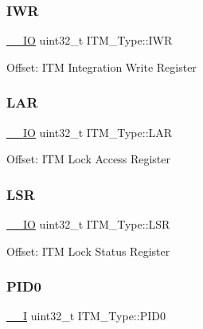 \subsubsection{\texorpdfstring{IWR}{IWR}}
{\footnotesize\ttfamily \mbox{\hyperlink{group___c_m_s_i_s___c_m3__core__definitions_gaec43007d9998a0a0e01faede4133d6be}{\+\_\+\+\_\+\+IO}} uint32\+\_\+t I\+T\+M\+\_\+\+Type\+::\+I\+WR}

Offset\+: I\+TM Integration Write Register ~\newline
 \mbox{\label{struct_i_t_m___type_a33025af19748bd3ca5cf9d6b14150001}} 
\subsubsection{\texorpdfstring{LAR}{LAR}}
{\footnotesize\ttfamily \mbox{\hyperlink{group___c_m_s_i_s___c_m3__core__definitions_gaec43007d9998a0a0e01faede4133d6be}{\+\_\+\+\_\+\+IO}} uint32\+\_\+t I\+T\+M\+\_\+\+Type\+::\+L\+AR}

Offset\+: I\+TM Lock Access Register ~\newline
 \mbox{\label{struct_i_t_m___type_a56f607260c4175c5f37a28e47ab3d1e5}} 
\subsubsection{\texorpdfstring{LSR}{LSR}}
{\footnotesize\ttfamily \mbox{\hyperlink{group___c_m_s_i_s___c_m3__core__definitions_gaec43007d9998a0a0e01faede4133d6be}{\+\_\+\+\_\+\+IO}} uint32\+\_\+t I\+T\+M\+\_\+\+Type\+::\+L\+SR}

Offset\+: I\+TM Lock Status Register ~\newline
 \mbox{\label{struct_i_t_m___type_ab69ade751350a7758affdfe396517535}} 
\subsubsection{\texorpdfstring{PID0}{PID0}}
{\footnotesize\ttfamily \mbox{\hyperlink{group___c_m_s_i_s___c_m3__core__definitions_gaf63697ed9952cc71e1225efe205f6cd3}{\+\_\+\+\_\+I}} uint32\+\_\+t I\+T\+M\+\_\+\+Type\+::\+P\+I\+D0}

